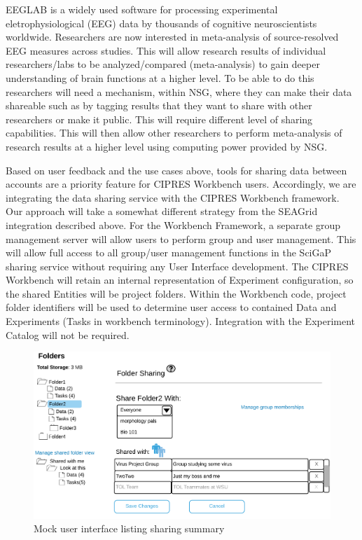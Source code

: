 \documentclass[sigconf]{acmart}
\begin{document}
EEGLAB \cite{delorme2004eeglab} is a widely used software for processing experimental eletrophysiological (EEG) data by thousands of cognitive neuroscientists worldwide. Researchers are now interested in meta-analysis of source-resolved EEG measures across studies. This will allow research results of individual researchers/labs to be analyzed/compared (meta-analysis) to gain deeper understanding of brain functions at a higher level. To be able to do this researchers will need a mechanism, within NSG, where they can make their data shareable such as by tagging results that they want to share with other researchers or make it public. This will require different level of sharing capabilities. This will then allow other researchers to perform meta-analysis of research results at a higher level using computing power provided by NSG.

Based on user feedback and the use cases above, tools for sharing data between accounts  are a priority feature for CIPRES Workbench users. Accordingly, we are integrating the data sharing service with the CIPRES Workbench framework. Our approach will take a somewhat different strategy from the SEAGrid integration described above. For the Workbench Framework, a separate group management server will allow users to perform group and user management. This will allow full access to all group/user management functions in the SciGaP sharing service without requiring any User Interface development. The CIPRES Workbench will retain an internal representation of Experiment configuration, so the shared Entities will be project folders.  Within the Workbench code, project folder identifiers will be used to determine user access to contained Data and Experiments (Tasks in workbench terminology). Integration with the Experiment Catalog will not be required.

\begin{figure}
\includegraphics[width=\columnwidth]{figures/cipres-mock-1.pdf}
\caption{Mock user interface listing sharing summary}
\end{figure}
\end{document}
